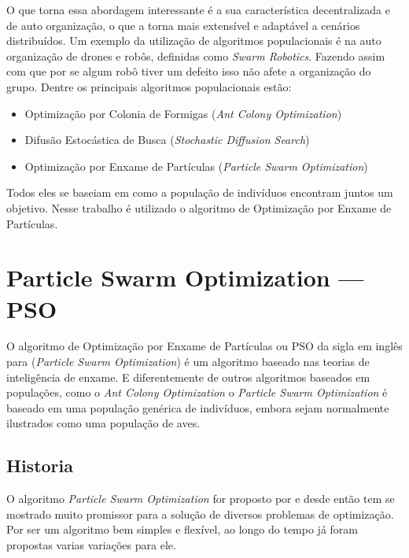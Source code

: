         O que torna essa abordagem interessante é a sua característica decentralizada e de auto organização, o que a torna mais extensível e adaptável a cenários distribuídos. Um exemplo da utilização de algoritmos populacionais é na auto organização de drones e robôs, definidas como \textit{Swarm Robotics}. Fazendo assim com que por se algum robô tiver um defeito isso não afete a organização do grupo.\newline
        Dentre os principais algoritmos populacionais estão:
        \begin{itemize}
            \item Optimização por Colonia de Formigas (\textit{Ant Colony Optimization}) 
            \item Difusão Estocástica de Busca (\textit{Stochastic Diffusion Search})
            \item Optimização por Enxame de Partículas (\textit{Particle Swarm Optimization})
        \end{itemize}
        
        Todos eles se baseiam em como a população de indivíduos encontram juntos um objetivo. Nesse trabalho é utilizado o algoritmo de Optimização por Enxame de Partículas. 


\section{Particle Swarm Optimization — PSO}
        O algoritmo de Optimização por Enxame de Partículas ou PSO da sigla em inglês para (\textit{Particle Swarm Optimization}) é um algoritmo baseado nas teorias de inteligência de enxame. E diferentemente de outros algoritmos baseados em populações, como o \textit{Ant Colony Optimization} o \textit{Particle Swarm Optimization} é baseado em uma população genérica de indivíduos, embora sejam normalmente ilustrados como uma população de aves.


    \subsection{Historia}
        O algoritmo \textit{Particle Swarm Optimization} for proposto por \cite{Kennedy1995} e desde então tem se mostrado muito promissor para a solução de diversos problemas de optimização. Por ser um algoritmo bem simples e flexível, ao longo do tempo já foram propostas varias variações para ele.\newline
        
